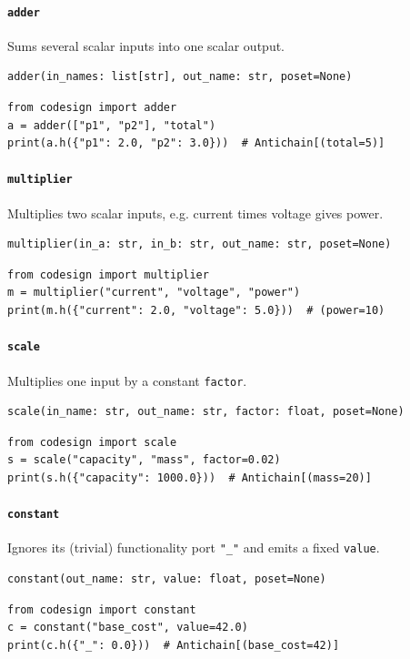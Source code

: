 \documentclass[11pt,a4paper]{article}
\begin{document}
\paragraph{\texttt{adder}}
\label{ref:primitives:adder}
Sums several scalar inputs into one scalar output.
\begin{lstlisting}
adder(in_names: list[str], out_name: str, poset=None)
\end{lstlisting}
\begin{lstlisting}
from codesign import adder
a = adder(["p1", "p2"], "total")
print(a.h({"p1": 2.0, "p2": 3.0}))  # Antichain[(total=5)]
\end{lstlisting}

\paragraph{\texttt{multiplier}}
\label{ref:primitives:multiplier}
Multiplies two scalar inputs, e.g. current times voltage gives power.
\begin{lstlisting}
multiplier(in_a: str, in_b: str, out_name: str, poset=None)
\end{lstlisting}
\begin{lstlisting}
from codesign import multiplier
m = multiplier("current", "voltage", "power")
print(m.h({"current": 2.0, "voltage": 5.0}))  # (power=10)
\end{lstlisting}

\paragraph{\texttt{scale}}
\label{ref:primitives:scale}
Multiplies one input by a constant \texttt{factor}.
\begin{lstlisting}
scale(in_name: str, out_name: str, factor: float, poset=None)
\end{lstlisting}
\begin{lstlisting}
from codesign import scale
s = scale("capacity", "mass", factor=0.02)
print(s.h({"capacity": 1000.0}))  # Antichain[(mass=20)]
\end{lstlisting}

\paragraph{\texttt{constant}}
\label{ref:primitives:constant}
Ignores its (trivial) functionality port \texttt{"\_"} and emits a fixed
\texttt{value}.
\begin{lstlisting}
constant(out_name: str, value: float, poset=None)
\end{lstlisting}
\begin{lstlisting}
from codesign import constant
c = constant("base_cost", value=42.0)
print(c.h({"_": 0.0}))  # Antichain[(base_cost=42)]
\end{lstlisting}
\end{document}
